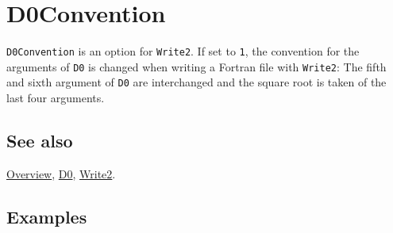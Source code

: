 \documentclass[../FeynCalcManual.tex]{subfiles}
\begin{document}
\hypertarget{d0convention}{
\section{D0Convention}\label{d0convention}}

\texttt{D0Convention} is an option for \texttt{Write2}. If set to
\texttt{1}, the convention for the arguments of \texttt{D0} is changed
when writing a Fortran file with \texttt{Write2}: The fifth and sixth
argument of \texttt{D0} are interchanged and the square root is taken of
the last four arguments.

\subsection{See also}

\hyperlink{toc}{Overview}, \hyperlink{d0}{D0},
\hyperlink{write2}{Write2}.

\subsection{Examples}
\end{document}
